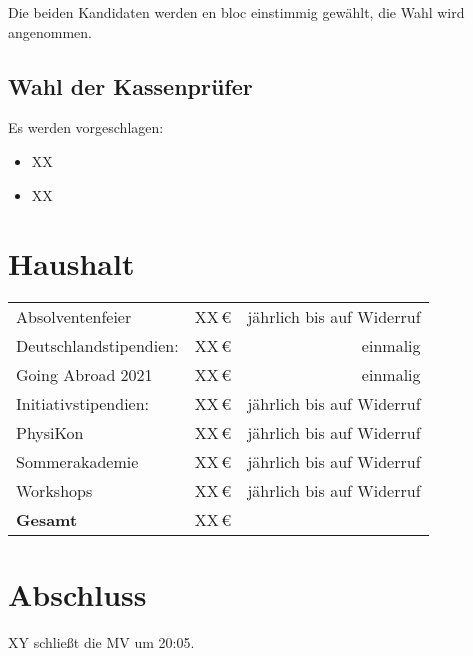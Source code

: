 \documentclass[
  paper=a4,
  fontsize=12pt,
  parskip=half,
  headinclude=true,
]{scrartcl}
\begin{document}
Die beiden Kandidaten werden en bloc einstimmig gewählt, die Wahl wird angenommen.


\subsection{Wahl der Kassenprüfer}
Es werden vorgeschlagen:

\begin{itemize}
  \item XX
  \item XX
\end{itemize}

\section{Haushalt}


\begin{center}
\begin{tabular}{l r r}
  \toprule
  Absolventenfeier       & XX\,€ & jährlich bis auf Widerruf\\
  Deutschlandstipendien: & XX\,€ & einmalig\\
  Going Abroad 2021      & XX\,€ & einmalig\\
  Initiativstipendien:   & XX\,€ & jährlich bis auf Widerruf\\
  PhysiKon               & XX\,€ & jährlich bis auf Widerruf\\
  Sommerakademie         & XX\,€ & jährlich bis auf Widerruf\\
  Workshops              & XX\,€ & jährlich bis auf Widerruf\\
  \midrule
  \bfseries Gesamt & XX\,€ & \\
  \bottomrule
\end{tabular}
\end{center}

\section{Abschluss}

XY schließt die MV um 20:05.
\end{document}
